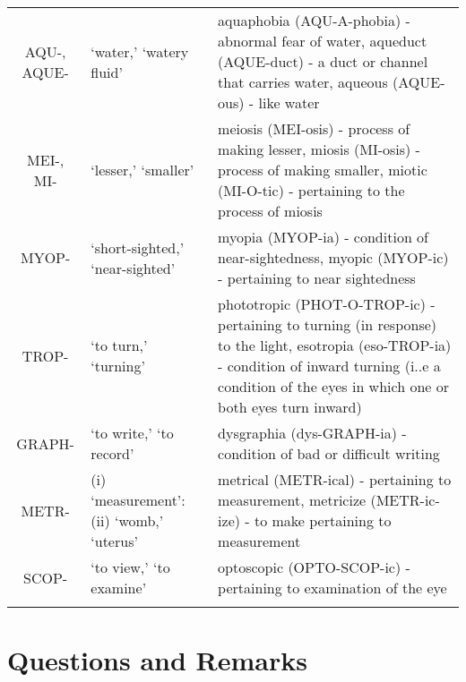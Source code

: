 \begin{longtable}{c | p{} | p{}}
        AQU-, AQUE- & `water,' `watery fluid' & aquaphobia (AQU-A-phobia) - abnormal fear of water, aqueduct (AQUE-duct) - a duct or channel that carries water, aqueous (AQUE-ous) - like water \\
        MEI-, MI- & `lesser,' `smaller' & meiosis (MEI-osis) - process of making lesser, miosis (MI-osis) - process of making smaller, miotic (MI-O-tic) - pertaining to the process of miosis \\
        MYOP- & `short-sighted,' `near-sighted' & myopia (MYOP-ia) - condition of near-sightedness, myopic (MYOP-ic) - pertaining to near sightedness \\
        TROP- & `to turn,' `turning' & phototropic (PHOT-O-TROP-ic) - pertaining to turning (in response) to the light, esotropia (eso-TROP-ia) - condition of inward turning (i..e a condition of the eyes in which one or both eyes turn inward) \\
        GRAPH- & `to write,' `to record' & dysgraphia (dys-GRAPH-ia) - condition of bad or difficult writing \\
        METR- & (i) `measurement': (ii) `womb,' `uterus' & metrical (METR-ical) - pertaining to measurement, metricize (METR-ic-ize) - to make pertaining to measurement \\
        SCOP- & `to view,' `to examine' & optoscopic (OPTO-SCOP-ic) - pertaining to examination of the eye \\
    \label{tab:Ch5Bases}
\end{longtable}




\section{Questions and Remarks}
\label{sec:QR5}






%
%
%


